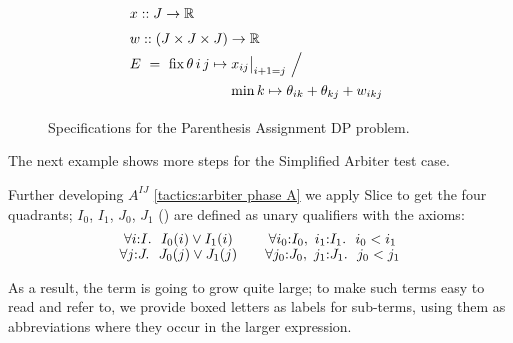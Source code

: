 \begin{figure}
\[
  \renewcommand\arraystretch{1.5}
  \begin{array}{@{}l@{}l}
    \lspan2{x :: J\to\R} \\
    \lspan2{w :: (J\times J\times J)\to\R} \\
    E ~=~ \fix \theta\,i\,j\mapsto{}
      & {x_{ij}\big|_{i+1=j} ~\Big/~} \\
      & \min k\mapsto\theta_{ik}+\theta_{kj}+w_{ikj} \\
  \end{array}
\]
\caption{\label{evaluation:paren spec}
  Specifications for the Parenthesis Assignment DP problem.}
\end{figure}


The next example shows more steps for the Simplified Arbiter test case.

\exampleTitle

Further developing $A^{IJ}$ \eqref{tactics:arbiter phase A}
we apply Slice to get the four quadrants; $I_0$, $I_1$, $J_0$, $J_1$
() are defined as unary qualifiers with the axioms:
\[
\begin{array}{c@{\qquad}c}
  \forall i{:}I.~~I_0(i)\lor I_1(i)   &    \forall i_0{:}I_0,~i_1{:}I_1.~~i_0<i_1 \\
  \forall j{:}J.~~J_0(j)\lor J_1(j)   &    \forall j_0{:}J_0,~j_1{:}J_1.~~j_0<j_1 \\
\end{array}
\]

As a result, the term is
going to grow quite large; to make such terms easy to read and refer to, we provide
boxed letters as labels for sub-terms, using them as abbreviations where they
occur in the larger expression.

\makeatletter
\newcommand{\quadrants@normal}[4]{
  \renewcommand\arraystretch{1.5}
   \begin{array}{c|c}
     #1 & #2 \\ \hline
     #3 & #4
   \end{array}}
\newcommand{\quadrants@small}[4]{
  \renewcommand\arraystretch{0.9}
   \begin{array}{@{~}c@{~}|@{~}c@{~}}
     \scriptstyle #1 & \scriptstyle #2 \\ \hline
     \scriptstyle #3 & \scriptstyle #4
   \end{array}}
\newcommand\quadrants{\@ifstar\quadrants@small\quadrants@normal}
\makeatother

